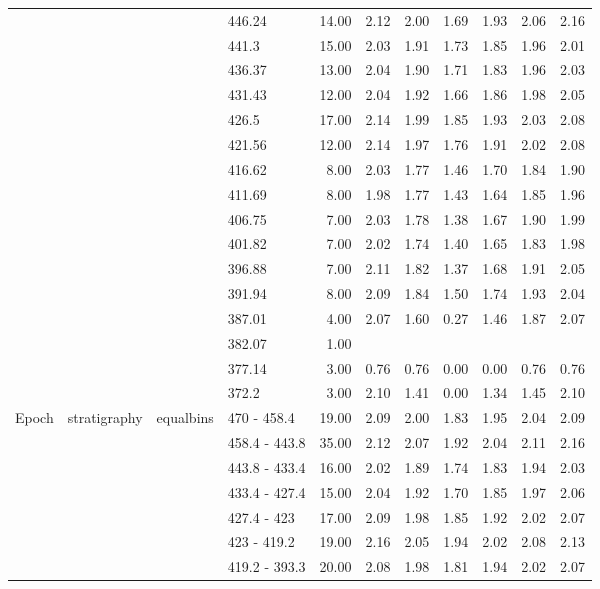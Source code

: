\begin{longtable}{llllrrrrrrr}
   &  &  & 446.24 & 14.00 & 2.12 & 2.00 & 1.69 & 1.93 & 2.06 & 2.16 \\ 
   &  &  & 441.3 & 15.00 & 2.03 & 1.91 & 1.73 & 1.85 & 1.96 & 2.01 \\ 
   &  &  & 436.37 & 13.00 & 2.04 & 1.90 & 1.71 & 1.83 & 1.96 & 2.03 \\ 
   &  &  & 431.43 & 12.00 & 2.04 & 1.92 & 1.66 & 1.86 & 1.98 & 2.05 \\ 
   &  &  & 426.5 & 17.00 & 2.14 & 1.99 & 1.85 & 1.93 & 2.03 & 2.08 \\ 
   &  &  & 421.56 & 12.00 & 2.14 & 1.97 & 1.76 & 1.91 & 2.02 & 2.08 \\ 
   &  &  & 416.62 & 8.00 & 2.03 & 1.77 & 1.46 & 1.70 & 1.84 & 1.90 \\ 
   &  &  & 411.69 & 8.00 & 1.98 & 1.77 & 1.43 & 1.64 & 1.85 & 1.96 \\ 
   &  &  & 406.75 & 7.00 & 2.03 & 1.78 & 1.38 & 1.67 & 1.90 & 1.99 \\ 
   &  &  & 401.82 & 7.00 & 2.02 & 1.74 & 1.40 & 1.65 & 1.83 & 1.98 \\ 
   &  &  & 396.88 & 7.00 & 2.11 & 1.82 & 1.37 & 1.68 & 1.91 & 2.05 \\ 
   &  &  & 391.94 & 8.00 & 2.09 & 1.84 & 1.50 & 1.74 & 1.93 & 2.04 \\ 
   &  &  & 387.01 & 4.00 & 2.07 & 1.60 & 0.27 & 1.46 & 1.87 & 2.07 \\ 
   &  &  & 382.07 & 1.00 &  &  &  &  &  &  \\ 
   &  &  & 377.14 & 3.00 & 0.76 & 0.76 & 0.00 & 0.00 & 0.76 & 0.76 \\ 
   &  &  & 372.2 & 3.00 & 2.10 & 1.41 & 0.00 & 1.34 & 1.45 & 2.10 \\ 
  Epoch & stratigraphy & equalbins & 470 - 458.4 & 19.00 & 2.09 & 2.00 & 1.83 & 1.95 & 2.04 & 2.09 \\ 
   &  &  & 458.4 - 443.8 & 35.00 & 2.12 & 2.07 & 1.92 & 2.04 & 2.11 & 2.16 \\ 
   &  &  & 443.8 - 433.4 & 16.00 & 2.02 & 1.89 & 1.74 & 1.83 & 1.94 & 2.03 \\ 
   &  &  & 433.4 - 427.4 & 15.00 & 2.04 & 1.92 & 1.70 & 1.85 & 1.97 & 2.06 \\ 
   &  &  & 427.4 - 423 & 17.00 & 2.09 & 1.98 & 1.85 & 1.92 & 2.02 & 2.07 \\ 
   &  &  & 423 - 419.2 & 19.00 & 2.16 & 2.05 & 1.94 & 2.02 & 2.08 & 2.13 \\ 
   &  &  & 419.2 - 393.3 & 20.00 & 2.08 & 1.98 & 1.81 & 1.94 & 2.02 & 2.07 \\ 

\end{longtable}
